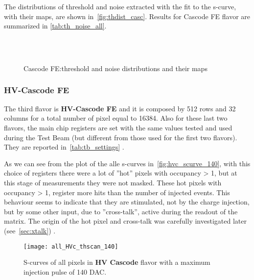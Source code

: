 The distributions of threshold and noise extracted with the fit to the s-curve, with their maps, are shown in~\autoref{fig:thdist_casc}. Results for Cascode FE flavor are summarized in \autoref{tab:th_noise_all}.


\begin{figure}[h!]
\centering
{}\quad
{}\\
\quad
{}\\
\caption{Cascode FE:threshold and noise distributions and their maps}
\label{fig:thdist_casc}
\end{figure}



\subsubsection{HV-Cascode FE}


The third flavor is \textbf{HV-Cascode FE} and it is composed by 512 rows and 32 columns for a total number of pixel equal to 16384. Also for these last two flavors, the main chip registers are set with the same values tested and used during the Test Beam (but different from those used for the first two flavors). They are reported in~\autoref{tab:tb_settings} .

As we can see from the plot of the alle s-curves in~\autoref{fig:hvc_scurve_140}, with this choice of registers there were a lot of ''hot'' pixels with occupancy > 1, but at this stage of measurements they were not masked.
These hot pixels with occupancy > 1, register more hits than the number of injected events. This behaviour seems to indicate that they are stimulated, not by the charge injection, but by some other input, due to ''cross-talk'', active during the readout of the matrix. The origin of the hot pixel and cross-talk was carefully investigated later (see~\autoref{sec:xtalk})
.

\begin{figure}[h!]
\centering
\texttt{[image: all\_HVc\_thscan\_140]}
\caption{S-curves of all pixels in \textbf{HV Cascode} flavor with a maximum injection pulse of 140 DAC.}
\label{fig:hvc_scurve_140}
\end{figure}

